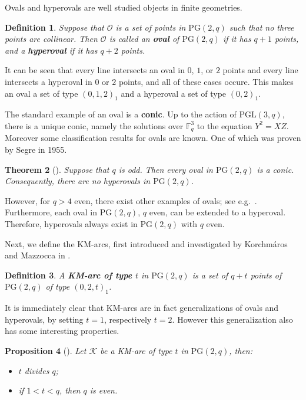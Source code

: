 \documentclass[11pt]{amsart}
\newtheorem{theorem}{Theorem}[section]
\newtheorem{definition}[theorem]{Definition}
\newtheorem{proposition}[theorem]{Proposition}
\newcommand{\PG}{\mathrm{PG}}
\begin{document}
Ovals and hyperovals are well studied objects in finite geometries.

\begin{definition}
Suppose that $\mathcal{O}$ is a set of points in $\PG(2,q)$ such that no three points are collinear. Then $\mathcal{O}$ is called an \textbf{oval} of $\PG(2,q)$ if it has $q+1$ points, and a \textbf{hyperoval} if  it has $q+2$ points. 
\end{definition}

It can be seen that every line intersects an oval in $0$, $1$, or $2$ points and  every line intersects a hyperoval in $0$ or $2$ points, and all of these cases occure. This makes an oval a set of type $(0,1,2)_1$ and a hyperoval a set of type $(0,2)_1$.

The standard example of an oval is a \textbf{conic}.
Up to the action of $\mathrm{PGL}(3,q)$, there is a unique conic, namely the solutions over $\mathbb{F}_{q}^3$ to the equation $Y^2 = X Z$.
Moreover some classification results for ovals are known. One of which was proven by Segre in 1955.
\begin{theorem}[{\cite[Theorem 1]{segre_1955}}]
Suppose that $q$ is odd.
Then every oval in $\PG(2,q)$ is a conic.
Consequently, there are no hyperovals in $\PG(2,q)$.
\end{theorem}
However, for $q > 4$ even, there exist other examples of ovals; see e.g.\ \cite{Brown}.
Furthermore, each oval in $\PG(2,q)$, $q$ even, can be extended to a hyperoval. Therefore, hyperovals always exist in $\mathrm{PG}(2,q)$ with $q$ even.

Next, we define the KM-arcs, first introduced and investigated by Korchm\'aros and Mazzocca in \cite{korchmaros1990on}.

\begin{definition}
A \textbf{KM-arc of type $t$} in $\PG(2,q)$ is a set of $q+t$ points of $\PG(2,q)$ of type $(0,2,t)_1$. 
\end{definition}
It is immediately clear that KM-arcs are in fact generalizations of ovals and hyperovals, by setting $t=1$, respectively $t=2$.
However this generalization also has some interesting properties.

\begin{proposition}[{\cite[Proposition 2.1]{korchmaros1990on}}]
 \label{prop:kmarcs}
Let $\mathcal{K}$ be a KM-arc of type $t$ in $\PG(2,q)$, then:
\begin{itemize}
    \item $t$ divides $q$;
    \item if $1 < t < q$, then $q$ is even.
\end{itemize}
\end{proposition}
\end{document}
